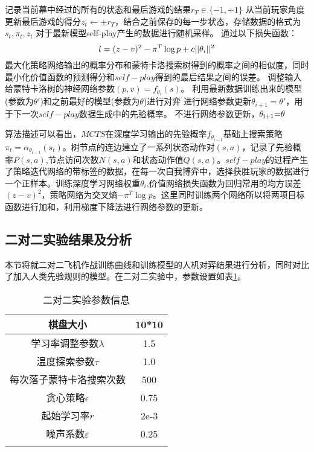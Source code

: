 		\begin{algorithm}[htbp]
		\begin{algorithmic}[1]
		\State 记录当前幕中经过的所有的状态和最后游戏的结果${r_T} \in \{  - 1, + 1\} $
		\State 从当前玩家角度更新最后游戏的得分${z_t} \leftarrow  \pm {r_T}$，结合之前保存的每一步状态，存储数据的格式为$s_t,\pi_t,z_t$
		\EndFor
		\State 对于最新模型self-play产生的数据进行随机采样。
		\State 通过以下损失函数：
		\begin{equation}
		l = {(z - v)^2} - {\pi ^T}\log p + c||{\theta _i}{\rm{|}}{{\rm{|}}^{\rm{2}}}
		\end{equation}
		最大化策略网络输出的概率分布和蒙特卡洛搜索树得到的概率之间的相似度，同时最小化价值函数的预测得分和$self-play$得到的最后结果之间的误差。
		调整输入给蒙特卡洛树的神经网络参数$(p,v) = {f_{{\theta _i}}}(s)$。
		\State 利用最新数据训练出来的模型(参数为$\theta '$)和之前最好的模型(参数为$\theta$)进行对弈
		 \State 进行网络参数更新${\theta _{i + 1}} = \theta '$，用于下一次$self-play$数据生成中的先验概率。
		\Else
		 \State 不进行网络参数更新，${\theta _{{\rm{i + 1}}}}{\rm{ = }}\theta $
		\EndIf
		\EndIf
		\EndFor
	\end{algorithmic}
\end{algorithm}

算法描述可以看出，$MCTS$在深度学习输出的先验概率${f_{{\theta _{i - 1}}}}$基础上搜索策略${\pi _t} = {\alpha _{{\theta _{i - 1}}}}({s_t})$。树节点的连边建立了一系列状态动作对$(s,a)$，记录了先验概率$P(s,a)$,节点访问次数$N(s,a)$和状态动作值$Q(s,a)$。$self-play$的过程产生了策略迭代网络的带标签的数据，在每一次自我博弈中，选择获胜玩家的数据进行一个正样本。训练深度学习网络权重${\theta _i}$,价值网络损失函数为回归常用的均方误差${(z - v)^2}$，策略网络为交叉熵$ - {\pi ^T}\log p$。这里同时训练两个网络所以将两项目标函数进行加和，利用梯度下降法进行网络参数的更新。

\subsection{二对二实验结果及分析}
本节将就二对二飞机作战训练曲线和训练模型的人机对弈结果进行分析，同时对比了加入人类先验规则的模型。在二对二实验中，参数设置如表\ref{erduiercanshu}。
\begin{table}[htbp]
	\centering
	\caption{二对二实验参数信息}
	\begin{tabular}{c|c}
		\hline 
		棋盘大小 & 10*10 \\ 
		\hline 
		学习率调整参数$\lambda$ & 1.5 \\ 
		\hline 
		温度探索参数$\tau$& 1.0 \\ 
		\hline 
		每次落子蒙特卡洛搜索次数 & 500 \\ 
		\hline 
		贪心策略$\epsilon$ & 0.75 \\ 
		\hline 
		起始学习率$r$ & 2e-3\\
		\hline 
		噪声系数$\varepsilon$ &0.25\\
		\hline
		\label{erduiercanshu}
	\end{tabular} 
\end{table}


